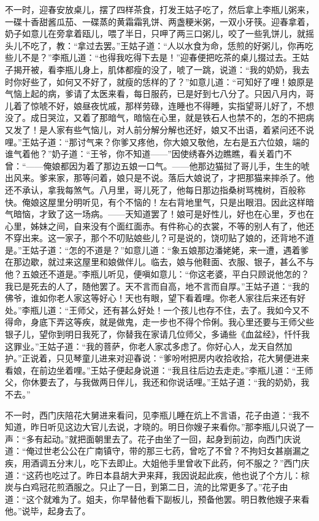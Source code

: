 不一时，迎春安放桌儿，摆了四样茶食，打发王姑子吃了，然后拿上李瓶儿粥来，一碟十香甜酱瓜茄、一碟蒸的黄霜霜乳饼、两盏粳米粥，一双小牙筷。迎春拿着，奶子如意儿在旁拿着瓯儿，喂了半日，只呷了两三口粥儿，咬了一些乳饼儿，就摇头儿不吃了，教：“拿过去罢。”王姑子道：“人以水食为命，恁煎的好粥儿，你再吃些儿不是？”李瓶儿道：“也得我吃得下去是！”迎春便把吃茶的桌儿掇过去。王姑子揭开被，看李瓶儿身上，肌体都瘦的没了，唬了一跳，说道：“我的奶奶，我去时你好些了，如何又不好了，就瘦的恁样的了？”如意儿道：“可知好了哩！娘原是气恼上起的病，爹请了太医来看，每日服药，已是好到七八分了。只因八月内，哥儿着了惊唬不好，娘昼夜忧戚，那样劳碌，连睡也不得睡，实指望哥儿好了，不想没了。成日哭泣，又着了那暗气，暗恼在心里，就是铁石人也禁不的，怎的不把病又发了！是人家有些气恼儿，对人前分解分解也还好，娘又不出语，着紧问还不说哩。”王姑子道：“那讨气来？你爹又疼他，你大娘又敬他，左右是五六位娘，端的谁气着他？”奶子道：“王爷，你不知道——”因使绣春外边瞧瞧，看关着门不曾：“——俺娘都因为着了那边五娘一口气。——他那边猫挝了哥儿手，生生的唬出风来。爹来家，那等问着，娘只是不说。落后大娘说了，才把那猫来摔杀了。他还不承认，拿我每煞气。八月里，哥儿死了，他每日那边指桑树骂槐树，百般称快。俺娘这屋里分明听见，有个不恼的！左右背地里气，只是出眼泪。因此这样暗气暗恼，才致了这一场病。——天知道罢了！娘可是好性儿，好也在心里，歹也在心里，姊妹之间，自来没有个面红面赤。有件称心的衣裳，不等的别人有了，他还不穿出来。这一家子，那个不叨贴娘些儿？可是说的，饶叨贴了娘的，还背地不道是。”王姑子道：“怎的不道是？”如意儿道：“象五娘那边潘姥姥，来一遭，遇着爹在那边歇，就过来这屋里和娘做伴儿。临去，娘与他鞋面、衣服、银子，甚么不与他？五娘还不道是。”李瓶儿听见，便嗔如意儿：“你这老婆，平白只顾说他怎的？我已是死去的人了，随他罢了。天不言而自高，地不言而自厚。”王姑子道：“我的佛爷，谁如你老人家这等好心！天也有眼，望下看着哩。你老人家往后来还有好处。”李瓶儿道：“王师父，还有甚么好处！一个孩儿也存不住，去了。我如今又不得命，身底下弄这等疾，就是做鬼，走一步也不得个伶俐。我心里还要与王师父些银子儿，望你到明日我死了，你替我在家请几位师父，多诵些《血盆经》，忏忏我这罪业。”王姑子道：“我的菩萨，你老人家忒多虑了。你好心人，龙天自然加护。”正说着，只见琴童儿进来对迎春说：“爹吩咐把房内收拾收拾，花大舅便进来看娘，在前边坐着哩。”王姑子便起身说道：“我且往后边去走走。”李瓶儿道：“王师父，你休要去了，与我做两日伴儿，我还和你说话哩。”王姑子道：“我的奶奶，我不去。”

不一时，西门庆陪花大舅进来看问，见李瓶儿睡在炕上不言语，花子由道：“我不知道，昨日听见这边大官儿去说，才晓的。明日你嫂子来看你。”那李瓶儿只说了一声：“多有起动。”就把面朝里去了。花子由坐了一回，起身到前边，向西门庆说道：“俺过世老公公在广南镇守，带的那三七药，曾吃了不曾？不拘妇女甚崩漏之疾，用酒调五分末儿，吃下去即止。大姐他手里曾收下此药，何不服之？”西门庆道：“这药也吃过了。昨日本县胡大尹来拜，我因说起此疾，他也说了个方儿：棕炭与白鸡冠花煎酒服之。只止了一日，到第二日，流的比常更多了。”花子由道：“这个就难为了。姐夫，你早替他看下副板儿，预备他罢。明日教他嫂子来看他。”说毕，起身去了。

